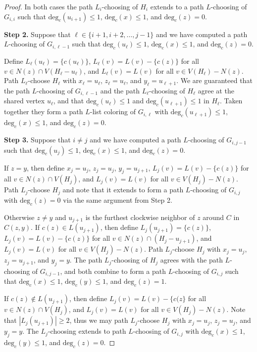 \documentclass[12pt,letterpaper]{article}
\theoremstyle{plain}
\theoremstyle{definition}
\theoremstyle{break}
\begin{document}
\begin{proof}
In both cases the path $L_i$-choosing of $H_i$ extends to a path
$L$-choosing of $G_{i,i}$ such that $\text{deg}_c(u_{i+1})\le 1$,
$\text{deg}_c(x)\le 1$, and $\text{deg}_c(z)=0$.

\textbf{Step 2.} Suppose that $\ell\in\{i+1, i+2,\ldots,j-1\}$
and we have computed a path $L$-choosing of $G_{i,\ell-1}$ such that
$\text{deg}_c(u_\ell)\le1$, $\text{deg}_c(x)\le 1$,
and $\text{deg}_c(z)=0$.

Define $L_\ell(u_\ell)=\{c(u_\ell)\}$,
$L_\ell(v)=L(v)-\{c(z)\}$ for
all $v\in N(z)\cap V(H_\ell-u_\ell)$, and
$L_\ell(v)=L(v)$ for all $v\in V(H_\ell)-N(z)$.
Path $L_\ell$-choose $H_\ell$ with
$x_\ell=u_\ell$, $z_\ell=u_\ell$, and
$y_\ell=u_{\ell+1}$. We are guaranteed that the path $L$-choosing
of $G_{i,\ell-1}$ and the path $L_\ell$-choosing of $H_\ell$ agree
at the shared vertex $u_\ell$, and that
$\text{deg}_c(u_\ell)\le 1$ and $\text{deg}_c(u_{\ell+1})\le 1$
in $H_\ell$. Taken together they form a
path $L$-list coloring of $G_{i,\ell}$ with $\text{deg}_c(u_{\ell+1})\le 1$,
$\text{deg}_c(x)\le 1$, and $\text{deg}_c(z)=0$.

\textbf{Step 3.} Suppose that $i\ne j$ and we
have computed a path $L$-choosing of $G_{i,j-1}$ such that
$\text{deg}_c(u_j)\le1$, $\text{deg}_c(x)\le 1$, and $\text{deg}_c(z)=0$. 

If $z=y$, then
define $x_j=u_j$, $z_j=u_j$, $y_j=u_{j+1}$,
$L_j(v)=L(v)-\{c(z)\}$ for all $v\in N(z)\cap V(H_j)$,
and $L_j(v)=L(v)$ for all $v\in V(H_j)-N(z)$. Path 
$L_j$-choose
$H_j$ and note that it extends to form a path
$L$-choosing of $G_{i,j}$ with
$\text{deg}_c(z)=0$ via the same argument from Step 2.

Otherwise $z\ne y$ and $u_{j+1}$ is the furthest clockwise neighbor of $z$
around $C$ in $C(z,y)$. If $c(z)\in L(u_{j+1})$, then define
$L_j(u_{j+1})=\{c(z)\}$, $L_j(v)=L(v)-\{c(z)\}$ for all $v\in
N(z)\cap(H_j-u_{j+1})$, and $L_j(v)=L(v)$ for all
$v\in V(H_j)-N(z)$. Path $L_j$-choose $H_j$ with $x_j=u_j$,
$z_j=u_{j+1}$, and $y_j=y$. The path $L_j$-choosing of $H_j$
agrees with the path $L$-choosing
of $G_{i,j-1}$, and both combine to form a path $L$-choosing
of $G_{i,j}$ such that $\text{deg}_c(x)\le 1$, $\text{deg}_c(y)\le 1$,
and $\text{deg}_c(z)=1$.

If $c(z)\not\in L(u_{j+1})$,
then define $L_j(v)=L(v)-\{c(z\}$ for all $v\in N(z)\cap V(H_j)$,
and $L_j(v)=L(v)$ for all $v\in V(H_j)-N(z)$. Note that
$|L_j(u_{j+1})|\ge 2$, thus we may path $L_j$-choose $H_j$ with
$x_j=u_j$, $z_j=u_j$, and $y_j=y$. The $L_j$-choosing extends to path
$L$-choosing of $G_{i,j}$ with $\text{deg}_c(x)\le 1$, $\text{deg}_c(y)\le 1$,
and $\text{deg}_c(z)=0$.


\end{proof}
\end{document}
